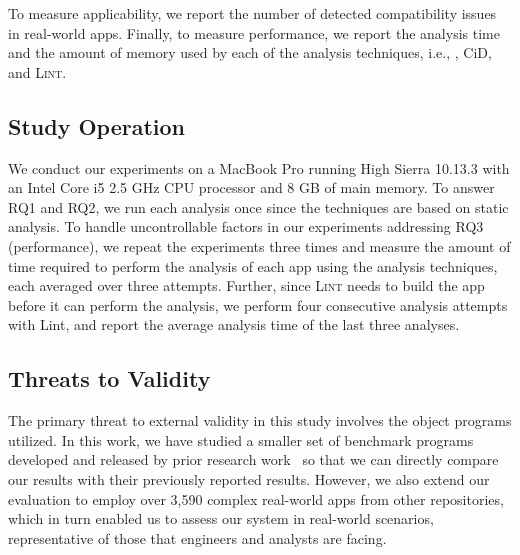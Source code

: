 


To measure applicability, we report the number of detected
compatibility issues in real-world apps. Finally, to measure
performance, we report the analysis time and the amount of memory used by each of the analysis techniques, i.e., \@approach, {\sc CiD}, and \textsc{Lint}.


\subsection{Study Operation}

We conduct our experiments on a MacBook Pro running
High Sierra 10.13.3 with an Intel Core i5 2.5 GHz CPU
processor and 8 GB of main memory. To answer RQ1 and
RQ2, we run each analysis once since the techniques are
based on static analysis.  To handle uncontrollable
factors in our experiments addressing RQ3
(performance), we repeat the experiments three times
and measure the amount of time required to perform the
analysis of each app using the analysis techniques,
each averaged over three attempts. Further, since
\textsc{Lint} needs to build the app before it can
perform the analysis, we perform four consecutive
analysis attempts with {\sc Lint}, and report the
average analysis time of the last three analyses. 


 
\subsection{Threats to Validity}

The primary threat to external validity in this study
involves the object programs utilized. In this work,
we have studied a smaller set of benchmark programs
developed and released by prior research
work~\cite{lili2018cid,huang2018understanding} so that
we can directly compare our results with their
previously reported results.  However, we also extend
our evaluation to employ over 3,590 complex real-world apps from
other repositories, which in turn enabled us to assess our system in
real-world scenarios, representative of those that
engineers and analysts are facing.

